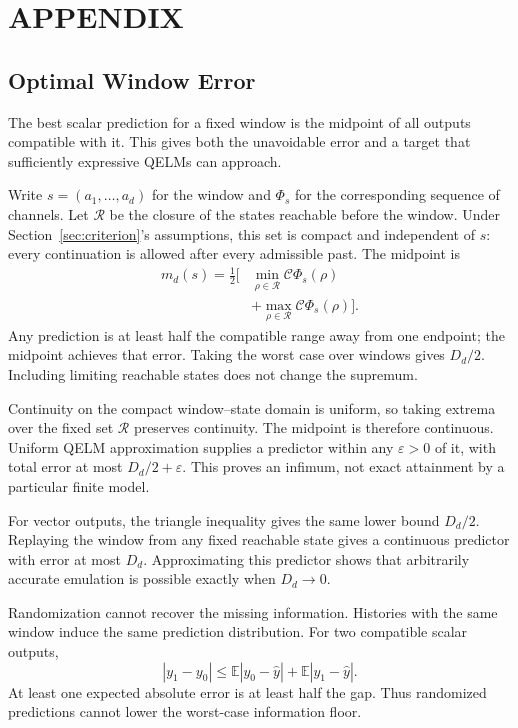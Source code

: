 \section*{APPENDIX}
\setcounter{subsection}{0}
\renewcommand{\thesubsection}{\Alph{subsection}}
\label{app:proofs}

\subsection{Optimal Window Error}
\label{app:window-laws}

The best scalar prediction for a fixed window is the midpoint of all
outputs compatible with it. This gives both the unavoidable error and a
target that sufficiently expressive QELMs can approach.

Write $s=(a_1,\ldots,a_d)$ for the window and $\Phi_s$ for the corresponding
sequence of channels. Let $\mathcal R$ be the closure of the states reachable
before the window. Under Section~\ref{sec:criterion}'s assumptions,
this set is compact and independent of $s$: every continuation is allowed
after every admissible past. The midpoint is
\[
 \begin{aligned}
 m_d(s)=\tfrac12\big[&
 \min_{\rho\in\mathcal R}\mathcal C\Phi_s(\rho)\\
 &+\max_{\rho\in\mathcal R}\mathcal C\Phi_s(\rho)\big].
 \end{aligned}
\]
Any prediction is at least half the compatible range away from one endpoint;
the midpoint achieves that error. Taking the worst case over windows gives
$D_d/2$. Including limiting reachable states does not change the supremum.

Continuity on the compact window--state domain is uniform, so taking
extrema over the fixed set $\mathcal R$ preserves continuity. The midpoint
is therefore continuous. Uniform QELM approximation supplies a predictor
within any $\varepsilon>0$ of it, with total error at most
$D_d/2+\varepsilon$. This proves an infimum, not exact attainment by a
particular finite model.

For vector outputs, the triangle inequality gives the same lower bound
$D_d/2$. Replaying the window from any fixed reachable state gives a
continuous predictor with error at most $D_d$. Approximating this predictor
shows that arbitrarily accurate emulation is possible exactly when $D_d\to0$.

Randomization cannot recover the missing information. Histories with the
same window induce the same prediction distribution. For two compatible
scalar outputs,
\[
 |y_1-y_0|\leq\mathbb E|y_0-\widehat y|+\mathbb E|y_1-\widehat y|.
\]
At least one expected absolute error is at least half the gap. Thus
randomized predictions cannot lower the worst-case information floor.

